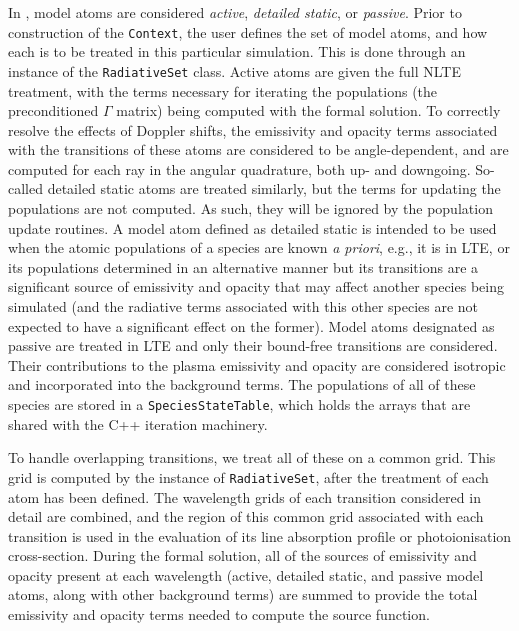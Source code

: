 In \Lw{}, model atoms are considered \emph{active}, \emph{detailed static}, or \emph{passive}.
Prior to construction of the \texttt{Context}, the user defines the set of model atoms, and how each is to be treated in this particular simulation.
This is done through an instance of the \texttt{RadiativeSet} class.
Active atoms are given the full NLTE treatment, with the terms necessary for iterating the populations (the preconditioned $\Gamma$ matrix) being computed with the formal solution.
To correctly resolve the effects of Doppler shifts, the emissivity and opacity terms associated with the transitions of these atoms are considered to be angle-dependent, and are computed for each ray in the angular quadrature, both up- and downgoing.
So-called detailed static atoms are treated similarly, but the terms for updating the populations are not computed.
As such, they will be ignored by the population update routines.
A model atom defined as detailed static is intended to be used when the atomic populations of a species are known \emph{a priori}, e.g., it is in LTE, or its populations determined in an alternative manner but its transitions are a significant source of emissivity and opacity that may affect another species being simulated (and the radiative terms associated with this other species are not expected to have a significant effect on the former).
Model atoms designated as passive are treated in LTE and only their bound-free transitions are considered.
Their contributions to the plasma emissivity and opacity are considered isotropic and incorporated into the background terms.
The populations of all of these species are stored in a \texttt{SpeciesStateTable}, which holds the arrays that are shared with the C++ iteration machinery.

To handle overlapping transitions, we treat all of these on a common grid.
This grid is computed by the instance of \texttt{RadiativeSet}, after the treatment of each atom has been defined.
The wavelength grids of each transition considered in detail are combined, and the region of this common grid associated with each transition is used in the evaluation of its line absorption profile or photoionisation cross-section.
During the formal solution, all of the sources of emissivity and opacity present at each wavelength (active, detailed static, and passive model atoms, along with other background terms) are summed to provide the total emissivity and opacity terms needed to compute the source function.

